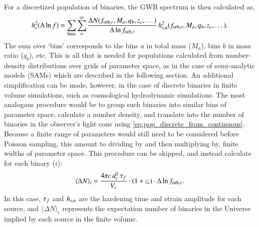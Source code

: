 \documentclass[useAMS, usenatbib]{mnras}
\begin{document}
        For a discretized population of binaries, the GWB spectrum is then calculated as,
        \begin{equation}
            \label{eq:gwb_discrete}
            h_{\textrm{c}}^2(\Delta \ln f) = \sum_\textrm{bins} \sum_n^\infty \frac{\Delta N(f_{\textrm{orb},r},M_a,q_b,z_c,\dots)}{\Delta \ln f_{\textrm{orb},r}} \, h_{\textrm{s,n}}^2(f_{\textrm{orb},r},M_a,q_b,z_c,\dots).
        \end{equation}
        The sum over `bins' corresponds to the bins $a$ in total mass ($M_a$), bins $b$ in mass ratio ($q_b$), etc.
        This is all that is needed for populations calculated from number-density distributions over grids of parameter space, as in the case of semi-analytic models (SAMs) which are described in the following section.  An additional simplification can be made, however, in the case of discrete binaries in finite volume simulations, such as cosmological hydrodynamic simulations.  The most analogous procedure would be to group such binaries into similar bins of parameter space, calculate a number density, and translate into the number of binaries in the observer's light cone using \eqref{eq:pop_discrete_from_continuous}.  Because a finite range of parameters would still need to be considered before Poisson sampling, this amount to dividing by and then multiplying by, finite widths of parameter space.  This procedure can be skipped, and instead calculate for each binary ($i$):
        \begin{equation}
            \label{eq:expectation_number_of_single_binary}
            \langle \Delta N \rangle_i = \frac{4\pi c \, d_c^2 \, \tau_f}{V_c} \cdot (1+z_i) \cdot \Delta \ln f_{\textrm{orb},r}.
        \end{equation}
        In this case, $\tau_f$ and $h_{\textrm{s,n}}$ are the hardening time and strain amplitude for each source, and $\langle \Delta N \rangle_i$ represents the expectation number of binaries in the Universe implied by each source in the finite volume.

\end{document}

